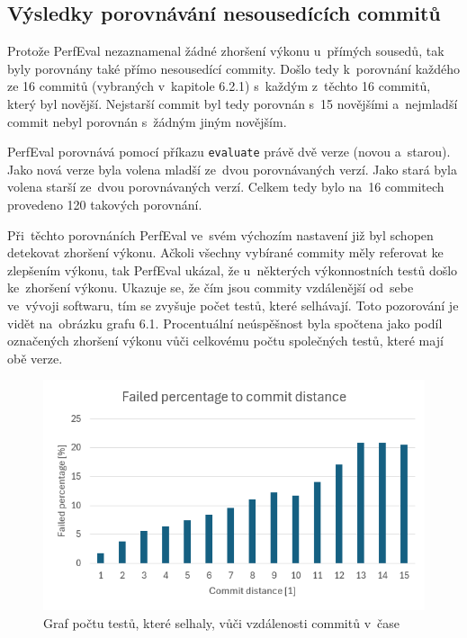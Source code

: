 \subsection{Výsledky porovnávání nesousedících commitů}

Protože PerfEval nezaznamenal žádné zhoršení výkonu u~přímých sousedů, tak byly porovnány také přímo nesousedící commity.
Došlo tedy k~porovnání každého ze 16 commitů (vybraných v~kapitole 6.2.1) s~každým z~těchto 16 commitů, který byl novější.
Nejstarší commit byl tedy porovnán s~15 novějšími a~nejmladší commit nebyl porovnán s~žádným jiným novějším.

PerfEval porovnává pomocí příkazu \texttt{evaluate} právě dvě verze (novou a~starou).
Jako nová verze byla volena mladší ze~dvou porovnávaných verzí. Jako stará byla volena
starší ze~dvou porovnávaných verzí. Celkem tedy bylo na~16 commitech provedeno 120 takových porovnání.

Při~těchto porovnáních PerfEval ve~svém výchozím nastavení již byl schopen detekovat zhoršení výkonu.
Ačkoli všechny vybírané commity měly referovat ke zlepšením výkonu, tak PerfEval ukázal, že
u~některých výkonnostních testů došlo ke~zhoršení výkonu. Ukazuje se, že čím jsou commity
vzdálenější od~sebe ve~vývoji softwaru, tím se zvyšuje počet testů, které selhávají.
Toto pozorování je vidět na~obrázku grafu 6.1. Procentuální neúspěšnost byla spočtena jako
podíl označených zhoršení výkonu vůči celkovému počtu společných testů, které mají obě verze.

\begin{figure}
    \centering
    \includegraphics[width=\textwidth]{../img/failure_percentage_graph.png}
    \caption{Graf počtu testů, které selhaly, vůči vzdálenosti commitů v~čase}
\end{figure}

